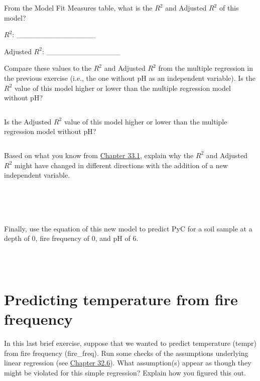 \documentclass[
  openany]{scrbook}
\begin{document}
From the Model Fit Measures table, what is the \(R^{2}\) and Adjusted \(R^{2}\) of this model?

\(R^{2}\): \_\_\_\_\_\_\_\_\_\_\_\_\_\_\_

Adjusted \(R^{2}\): \_\_\_\_\_\_\_\_\_\_\_\_\_\_

Compare these values to the \(R^{2}\) and Adjusted \(R^{2}\) from the multiple regression in the previous exercise (i.e., the one without pH as an independent variable).
Is the \(R^{2}\) value of this model higher or lower than the multiple regression model without pH?

\begin{verbatim}
\end{verbatim}

Is the Adjusted \(R^{2}\) value of this model higher or lower than the multiple regression model without pH?

\begin{verbatim}
\end{verbatim}

Based on what you know from \protect\hyperlink{adjusted-coefficient-of-determination}{Chapter 33.1}, explain why the \(R^{2}\) and Adjusted \(R^{2}\) might have changed in different directions with the addition of a new independent variable.

\begin{verbatim}




\end{verbatim}

Finally, use the equation of this new model to predict PyC for a soil sample at a depth of 0, fire frequency of 0, and pH of 6.

\begin{verbatim}



\end{verbatim}

\hypertarget{predicting-temperature-from-fire-frequency}{%
\section{Predicting temperature from fire frequency}\label{predicting-temperature-from-fire-frequency}}

In this last brief exercise, suppose that we wanted to predict temperature (tempr) from fire frequency (fire\_freq).
Run some checks of the assumptions underlying linear regression (see \protect\hyperlink{regression-assumptions}{Chapter 32.6}).
What assumption(s) appear as though they might be violated for this simple regression?
Explain how you figured this out.
\end{document}
